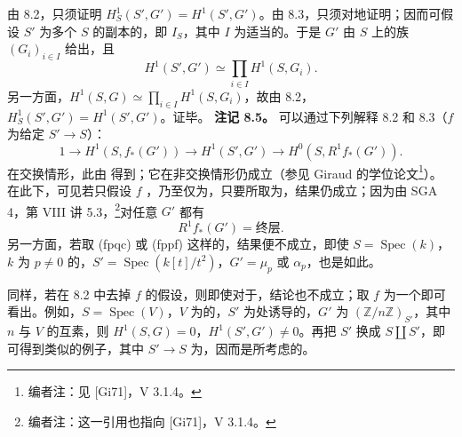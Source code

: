 由 8.2，只须证明 $H^1_S(S',G')=H^1(S',G')$。由 8.3，只须对地证明；因而可假设 $S'$ 为多个 $S$ 的副本的，即 $I_S$，其中 $I$ 为适当的。于是 $G'$ 由 $S$ 上的族 $(G_i)_{i\in I}$ 给出，且
\[H^1(S',G')\simeq\prod_{i\in I}H^1(S,G_i).\]
另一方面，$H^1(S,G)\simeq\prod_{i\in I}H^1(S,G_i)$，故由 8.2，$H^1_S(S',G')=H^1(S',G')$。证毕。
\textbf{注记 8.5。} 可以通过下列解释 8.2 和 8.3（$f$ 为给定 $S'\to S$）：
\[1\longrightarrow H^1(S,f_*(G'))\longrightarrow H^1(S',G')\longrightarrow H^0(S,R^1f_*(G')).\]
在交换情形，此由 得到；它在非交换情形仍成立（参见 Giraud 的学位论文\footnote{编者注：见 [Gi71]，V 3.1.4。}）。
在此下，可见若只假设 $f$ ，乃至仅为，只要所取为，结果仍成立；因为由 SGA 4，第 VIII 讲 5.3，\footnote{编者注：这一引用也指向 [Gi71]，V 3.1.4。}对任意 $G'$ 都有
\[R^1f_*(G')=\text{终层}.\]
另一方面，若取 (fpqc) 或 (fppf) 这样的，结果便不成立，即使 $S=\operatorname{Spec}(k)$，$k$ 为 $p\ne0$ 的，$S'=\operatorname{Spec}(k[t]/t^2)$，$G'=\mu_p$ 或 $\alpha_p$，也是如此。

同样，若在 8.2 中去掉 $f$ 的假设，则即使对于，结论也不成立；取 $f$ 为一个即可看出。例如，$S=\operatorname{Spec}(V)$，$V$ 为的，$S'$ 为处诱导的，$G'$ 为 $(\mathbb Z/n\mathbb Z)_{S'}$，其中 $n$ 与 $V$ 的互素，则 $H^1(S,G)=0$，$H^1(S',G')\ne0$。再把 $S'$ 换成 $S\amalg S'$，即可得到类似的例子，其中 $S'\to S$ 为，因而是所考虑的。

